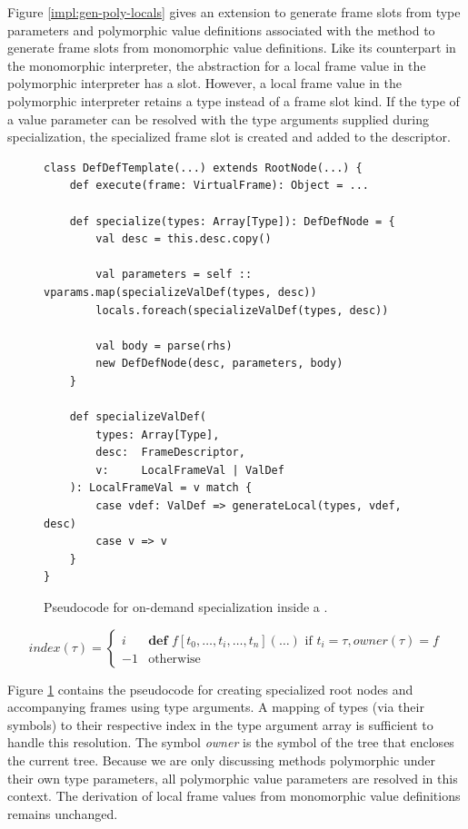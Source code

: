 Figure \ref{impl:gen-poly-locals} gives an extension to generate frame slots from type parameters and polymorphic value definitions associated with the method to generate frame slots from monomorphic value definitions.
Like its counterpart in the monomorphic interpreter, the abstraction for a local frame value in the polymorphic interpreter has a slot.
However, a local frame value in the polymorphic interpreter retains a type instead of a frame slot kind.
If the type of a value parameter can be resolved with the type arguments supplied during specialization, the specialized frame slot is created and added to the descriptor.

\begin{figure}[!htb]
\begin{verbatim}
class DefDefTemplate(...) extends RootNode(...) {
	def execute(frame: VirtualFrame): Object = ...
		
	def specialize(types: Array[Type]): DefDefNode = {
		val desc = this.desc.copy()
			
		val parameters = self :: vparams.map(specializeValDef(types, desc))
		locals.foreach(specializeValDef(types, desc))
			
		val body = parse(rhs)
		new DefDefNode(desc, parameters, body)
	}

	def specializeValDef(
		types: Array[Type], 
		desc:  FrameDescriptor, 
		v:     LocalFrameVal | ValDef
	): LocalFrameVal = v match {
		case vdef: ValDef => generateLocal(types, vdef, desc)
		case v => v
	}
}
\end{verbatim}
\caption{Pseudocode for on-demand specialization inside a .}
\label{impl:defdeftemplate-specialize}
\end{figure}

$$
index(\tau) = 
\begin{cases}
	i  & \textbf{def } f[t_0, \ldots, t_i, \ldots, t_n](\ldots) \text{ if } t_i = \tau, owner(\tau)=f \\
	-1 & \text{otherwise}
\end{cases}
$$

Figure \ref{impl:defdeftemplate-specialize} contains the pseudocode for creating specialized root nodes and accompanying frames using type arguments.
A mapping of types (via their symbols) to their respective index in the type argument array is sufficient to handle this resolution.
The symbol \textit{owner} is the symbol of the tree that encloses the current tree.
Because we are only discussing methods polymorphic under their own type parameters, all polymorphic value parameters are resolved in this context.
The derivation of local frame values from monomorphic value definitions remains unchanged. 


